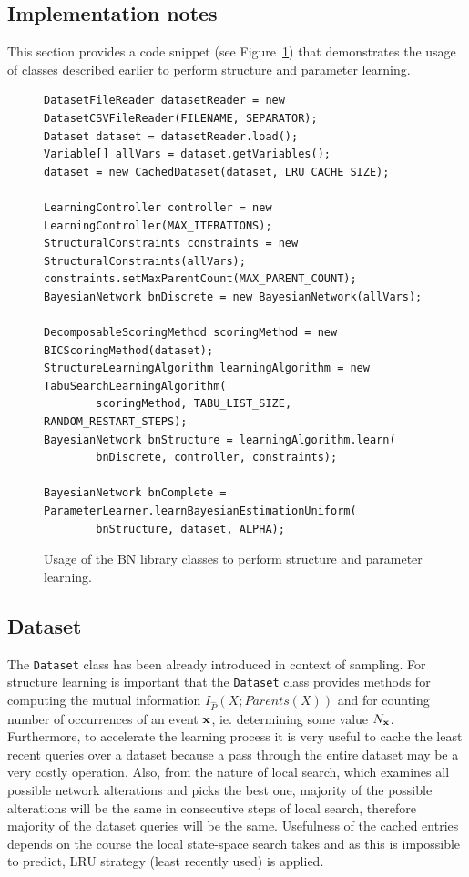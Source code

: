 \documentclass[english,cover]{fitthesis} %
\newcommand{\srccode}[1]{{\tt #1}}         %
\newcommand{\vars}[1]{{\bold{#1}}}         %
\begin{document}
\subsection{Implementation notes}
This section provides a code snippet (see Figure~\ref{fig:snippet-learning}) that demonstrates the usage of classes described earlier to perform structure and parameter learning.

\begin{figure}[ht]
\begin{center}
\begin{verbatim}
DatasetFileReader datasetReader = new DatasetCSVFileReader(FILENAME, SEPARATOR);
Dataset dataset = datasetReader.load();
Variable[] allVars = dataset.getVariables();
dataset = new CachedDataset(dataset, LRU_CACHE_SIZE);

LearningController controller = new LearningController(MAX_ITERATIONS);
StructuralConstraints constraints = new StructuralConstraints(allVars);
constraints.setMaxParentCount(MAX_PARENT_COUNT);
BayesianNetwork bnDiscrete = new BayesianNetwork(allVars);

DecomposableScoringMethod scoringMethod = new BICScoringMethod(dataset);
StructureLearningAlgorithm learningAlgorithm = new TabuSearchLearningAlgorithm(
        scoringMethod, TABU_LIST_SIZE, RANDOM_RESTART_STEPS);
BayesianNetwork bnStructure = learningAlgorithm.learn(
        bnDiscrete, controller, constraints);

BayesianNetwork bnComplete = ParameterLearner.learnBayesianEstimationUniform(
        bnStructure, dataset, ALPHA);
\end{verbatim}
\end{center}
\caption{Usage of the BN library classes to perform structure and parameter learning.}
\label{fig:snippet-learning}
\end{figure}



\subsection{Dataset}
The \srccode{Dataset} class has been already introduced in context of sampling. For structure learning is important that the \srccode{Dataset} class provides methods for computing the mutual information $I_{\hat P}(X; Parents(X))$ and for counting number of occurrences of an event $\vars{x}$, ie. determining some value $N_\vars{x}$. Furthermore, to accelerate the learning process it is very useful to cache the least recent queries over a dataset because a pass through the entire dataset may be a very costly operation. Also, from the nature of local search, which examines all possible network alterations and picks the best one, majority of the possible alterations will be the same in consecutive steps of local search, therefore majority of the dataset queries will be the same. Usefulness of the cached entries depends on the course the local state-space search takes and as this is impossible to predict, LRU strategy (least recently used) is applied.
\end{document}
